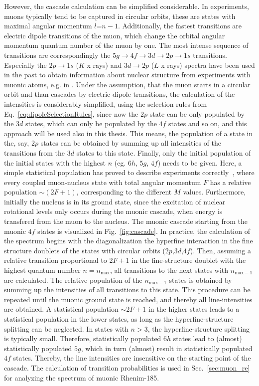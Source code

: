 However, the cascade calculation can be simplified considerable. In experiments, muons typically tend to be captured in circular orbits, these are states with maximal angular momentum $l$=$n-1$. Additionally, the fastest transitions are electric dipole transitions of the muon, which change the orbital angular momentum quantum number of the muon by one. The most intense sequence of transitions are correspondingly the $5g\rightarrow 4f \rightarrow 3d \rightarrow 2p \rightarrow 1s$ transitions. Especially the $2p\rightarrow 1s$ ($K$ x rays) and $3d\rightarrow 2p$ ($L$ x rays) spectra have been used in the past to obtain information about nuclear structure from experiments with muonic atoms, e.g. in \cite{tanaka1983,tanaka1984,tanaka1984_2,hitlin1970,Dey1979,dewit1966,Bergem1988}. Under the assumption, that the muon starts in a circular orbit and than cascades by electric dipole transitions, the calculation of the intensities is considerably simplified, using the selection rules from Eq.~\eqref{eq:dipoleSelectionRules}, since now the $2p$ state can be only populated by the $3d$ states, which can only be populated by the $4f$ states and so on, and this approach will be used also in this thesis. This means, the population of a state in the, say, $2p$ states can be obtained by summing up all intensities of the transitions from the $3d$ states to this state. Finally, only the initial population of the initial states with the highest $n$ (eg. $6h$, $5g$, $4f$) needs to be given. Here, a simple statistical population has proved to describe experiments correctly~\cite{Dey1979}, where every coupled muon-nucleus state with total angular momentum $F$ has a relative population $\sim (2F+1)$, corresponding to the different $M$ values. Furthermore, initially the nucleus is in its ground state, since the excitation of nuclear rotational levels only occurs during the muonic cascade, when energy is transfered from the muon to the nucleus.
The muonic cascade starting from the muonic $4f$ states is visualized in Fig.~\ref{fig:cascade}. In practice, the calculation of the spectrum begins with the diagonalization the hyperfine interaction in the fine structure doublets of the states with circular orbits ($2p$,$3d$,$4f$). Then, assuming a relative transition proportional to $2F+1$ in the fine-structure doublet with the highest quantum number $n=n_{\text{max}}$, all transitions to the next states with $n_{\text{max}-1}$ are calculated. The relative population of the $n_{\text{max}-1}$ states is obtained by summing up the intensities of all transitions to this state. This procedure can be repeated until the muonic ground state is reached, and thereby all line-intensities are obtained. A statistical population $\sim 2F+1$ in the higher states leads to a statistical population in the lower states, as long as the hyperfine-structure  splitting can be neglected. In states with $n>3$, the hyperfine-structure splitting is typically small. Therefore, statistically populated $6h$ states lead to (almost) statistically populated $5g$, which in turn (almost) result in statistically populated $4f$ states. Thereby, the line intensities are insensitive on the starting point of the cascade. The calculation of transition probabilities is used in Sec.~\ref{sec:muon_re} for analyzing the spectrum of muonic Rhenim-185.
